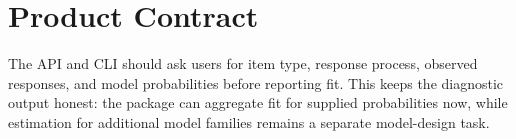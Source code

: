 \documentclass[11pt]{article}
\begin{document}
\section{Product Contract}

The API and CLI should ask users for item type, response process, observed
responses, and model probabilities before reporting fit. This keeps the
diagnostic output honest: the package can aggregate fit for supplied
probabilities now, while estimation for additional model families remains a
separate model-design task.
\end{document}
